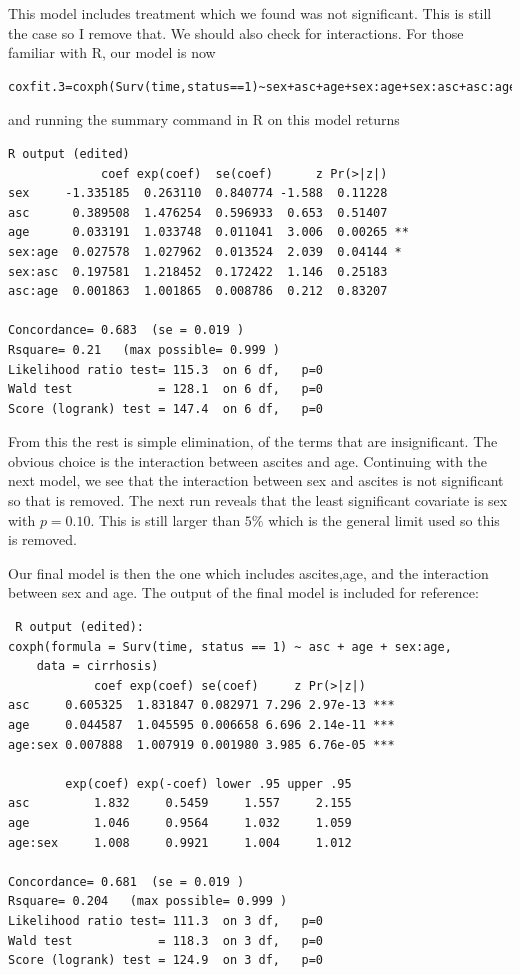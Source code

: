 \documentclass[a4paper]{article}
\begin{document}
This model includes treatment which we found was not significant. This is still the case so I remove that. We should also check for interactions. 
For those familiar with R, our model is now 
\begin{verbatim}
coxfit.3=coxph(Surv(time,status==1)~sex+asc+age+sex:age+sex:asc+asc:age,data=cirrhosis)
\end{verbatim}
and running the summary command in R on this model returns
\begin{verbatim}
R output (edited)
             coef exp(coef)  se(coef)      z Pr(>|z|)   
sex     -1.335185  0.263110  0.840774 -1.588  0.11228   
asc      0.389508  1.476254  0.596933  0.653  0.51407   
age      0.033191  1.033748  0.011041  3.006  0.00265 **
sex:age  0.027578  1.027962  0.013524  2.039  0.04144 * 
sex:asc  0.197581  1.218452  0.172422  1.146  0.25183   
asc:age  0.001863  1.001865  0.008786  0.212  0.83207   

Concordance= 0.683  (se = 0.019 )
Rsquare= 0.21   (max possible= 0.999 )
Likelihood ratio test= 115.3  on 6 df,   p=0
Wald test            = 128.1  on 6 df,   p=0
Score (logrank) test = 147.4  on 6 df,   p=0
\end{verbatim}
From this the rest is simple elimination, of the terms that are insignificant. The obvious choice is the interaction between ascites and age. Continuing with the next model, we see that the interaction between sex and ascites is not significant so that is removed. The next run reveals that the least significant covariate is sex with $p = 0.10$. This is still larger than $5\%$ which is the general limit used so this is removed.

Our final model is then the one which includes ascites,age, and the interaction between sex and age.
The output of the final model is included for reference:
\begin{verbatim}
 R output (edited):
coxph(formula = Surv(time, status == 1) ~ asc + age + sex:age, 
    data = cirrhosis)
            coef exp(coef) se(coef)     z Pr(>|z|)    
asc     0.605325  1.831847 0.082971 7.296 2.97e-13 ***
age     0.044587  1.045595 0.006658 6.696 2.14e-11 ***
age:sex 0.007888  1.007919 0.001980 3.985 6.76e-05 ***

        exp(coef) exp(-coef) lower .95 upper .95
asc         1.832     0.5459     1.557     2.155
age         1.046     0.9564     1.032     1.059
age:sex     1.008     0.9921     1.004     1.012

Concordance= 0.681  (se = 0.019 )
Rsquare= 0.204   (max possible= 0.999 )
Likelihood ratio test= 111.3  on 3 df,   p=0
Wald test            = 118.3  on 3 df,   p=0
Score (logrank) test = 124.9  on 3 df,   p=0
\end{verbatim}
\end{document}
